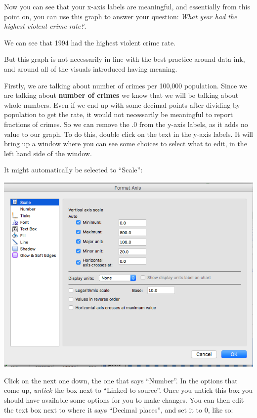 \documentclass[]{book}
\theoremstyle{definition}
\theoremstyle{definition}
\theoremstyle{definition}
\theoremstyle{remark}
\begin{document}
Now you can see that your x-axis labels are meaningful, and essentially
from this point on, you can use this graph to answer your question:
\emph{What year had the highest violent crime rate?}.

We can see that 1994 had the highest violent crime rate.

But this graph is not necessarily in line with the best practice around
data ink, and around all of the visuals introduced having meaning.

Firstly, we are talking about number of crimes per 100,000 population.
Since we are talking about \textbf{number of crimes} we know that we
will be talking about whole numbers. Even if we end up with some decimal
points after dividing by population to get the rate, it would not
necessarily be meaningful to report fractions of crimes. So we can
remove the .0 from the y-axis labels, as it adds no value to our graph.
To do this, double click on the text in the y-axis labels. It will bring
up a window where you can see some choices to select what to edit, in
the left hand side of the window.

It might automatically be selected to ``Scale'':

\includegraphics{imgs/desc_viz_7.png}

Click on the next one down, the one that says ``Number''. In the options
that come up, \emph{untick} the box next to ``Linked to source''. Once
you untick this box you should have available some options for you to
make changes. You can then edit the text box next to where it says
``Decimal places'', and set it to 0, like so:
\end{document}
